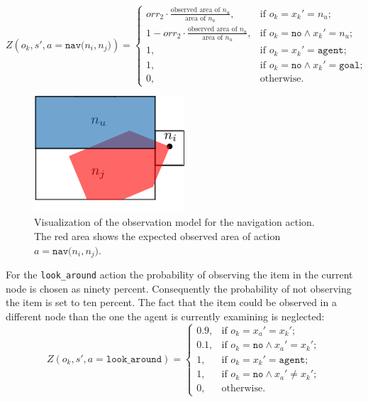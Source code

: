 \begin{equation}\label{eq:Onav}
    Z(o_k, s', a=\texttt{nav($n_i, n_j$)}) = 
    \begin{cases}
        orr_2 \cdot \frac{\text{observed area of }n_u}{\text{area of }n_u}, & \text{if }o_k=x_k'=n_u ;\\
        1 - orr_2 \cdot \frac{\text{observed area of }n_u}{\text{area of }n_u}, & \text{if } o_k=\texttt{no}\land x_k'=n_u;\\
        1, & \text{if }o_k=x_k'=\texttt{agent};\\
        1, & \text{if }o_k=\texttt{no}\land x_k'=\texttt{goal};\\
        0, & \text{otherwise}.
    \end{cases}
\end{equation}
\begin{figure}
    \centering
    \includegraphics[width=0.5\textwidth]{Report/images/observationmodel.png}
    \caption{Visualization of the observation model for the navigation action. The red area shows the expected observed area of action $a=\texttt{nav($n_i, n_j$)}$.}
    \label{fig:obsmodel}
\end{figure}
For the \texttt{look\_around} action the probability of observing the item in the current node is chosen as ninety percent. Consequently the probability of not observing the item is set to ten percent. The fact that the item could be observed in a different node than the one the agent is currently examining is neglected:
\begin{equation}\label{eq:lookaround}
    Z(o_k, s', a=\texttt{look\_around}) = \begin{cases}
    0.9,& \text{if } o_k=x_a'=x_k';\\
    0.1, &\text{if } o_k=\texttt{no} \land x_a'=x_k';\\
    1,& \text{if }o_k=x_k'=\texttt{agent};\\
    1,& \text{if }o_k=\texttt{no}\land x_a'\neq x_k';
    \\0, &\text{otherwise}. \end{cases}
\end{equation}
